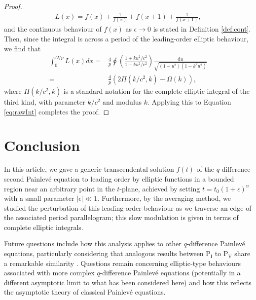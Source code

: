 \documentclass[reqno,a4paper]{amsart}
\numberwithin{equation}{section}
\theoremstyle{plain}
\theoremstyle{remark}
\newcommand\Pone{\textrm{P}_{\textrm{I}}}
\newcommand\Pfive{\textrm{P}_{\textrm{V}}}
\begin{document}
\begin{proof}
\begin{align*}
        L(x)=f(x)+\frac{1}{f(x)}+f(x+1)+\frac{1}{f(x+1)},
    \end{align*}
    and the continuous behaviour of $f(x)$ as $\epsilon\to0$ is stated in Definition \ref{def:cont}. Then, since the integral is across a period of the leading-order elliptic behaviour, we find that
    \begin{align*}
        \int_{0}^{\Omega/p}L(x)dx=&\frac{4}{p}\oint\left(\frac{1+ku^2/c^2}{1-ku^2/c^2}\right)\frac{\text{d}u}{\sqrt{(1-u^2)(1-k^2u^2)}}\\
        =&\frac{4}{p}\left(2\Pi(k/c^2,k)-\Omega(k)\right),
    \end{align*}
    where $\Pi(k/c^2,k)$ is a standard notation for the complete elliptic integral of the third kind, with parameter $k/c^2$ and modulus $k$. Applying this to Equation \eqref{eq:rawInt} completes the proof.
\end{proof}
\section{Conclusion}
In this article, we gave a generic transcendental solution $f(t)$ of the $q$-difference second Painlev\'e equation to leading order by elliptic functions in a bounded region near an arbitrary point in the $t$-plane, achieved by setting $t=t_0(1+\epsilon)^n$ with a small parameter $|\epsilon|\ll1$. Furthermore, by the averaging method, we studied the perturbation of this leading-order behaviour as we traverse an edge of the associated period parallelogram; this slow modulation is given in terms of complete elliptic integrals.

Future questions include how this analysis applies to other $q$-difference Painlev\'e equations, particularly considering that analogous results between $\Pone$ to $\Pfive$ share a remarkable similarity \cite{joshi2018asymptotic}. Questions remain concerning elliptic-type behaviours associated with more complex $q$-difference Painlev\'e equations (potentially in a different asymptotic limit to what has been considered here) and how this reflects the asymptotic theory of classical Painlev\'e equations.
\appendix
\end{document}
